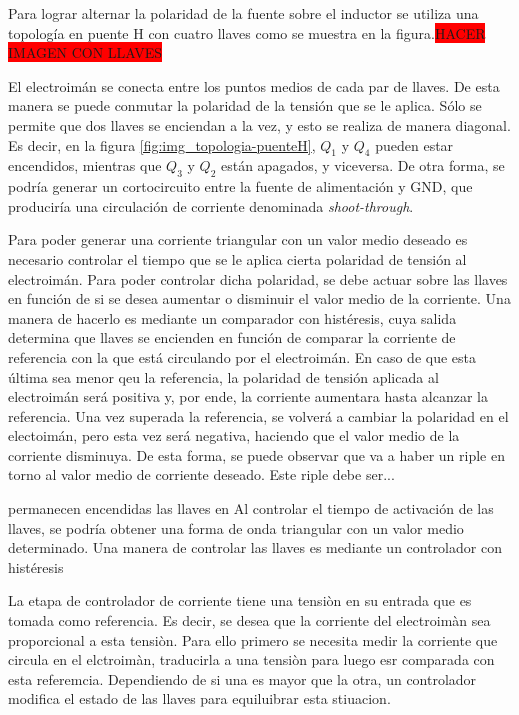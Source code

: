 \noindent Para lograr alternar la polaridad de la fuente sobre el inductor se utiliza una topología en puente H con cuatro llaves como se  muestra en la figura.\colorbox{red}{HACER IMAGEN CON LLAVES} 

El electroimán se conecta entre los puntos medios de cada par de llaves. De esta manera se puede conmutar la polaridad de la tensión que se le aplica. Sólo se permite que dos llaves se enciendan a la vez, y esto se realiza de manera diagonal. Es decir, en la figura \ref{fig:img_topologia-puenteH}, $Q_1$ y $Q_4$ pueden estar encendidos, mientras que $Q_3$ y $Q_2$ están apagados, y viceversa. De otra forma, se podría generar un cortocircuito entre la fuente de alimentación y GND, que produciría una circulación de corriente denominada \textsl{shoot-through}.

Para poder generar una corriente triangular con un valor medio deseado es necesario controlar el tiempo que se le aplica cierta polaridad de tensión al electroimán. Para poder controlar dicha polaridad, se debe actuar sobre las llaves en función de si se desea aumentar o disminuir el valor medio de la corriente.  Una manera de hacerlo es mediante un comparador con histéresis, cuya salida determina que llaves se encienden en función de comparar la corriente de referencia con la que está circulando por el electroimán. En caso de que esta última sea menor qeu la referencia, la polaridad de tensión aplicada al electroimán será positiva y, por ende, la corriente aumentara hasta alcanzar la referencia. Una vez superada la referencia, se volverá a cambiar la polaridad en el electoimán, pero esta vez será negativa, haciendo que el valor medio de la corriente disminuya. De esta forma, se puede observar que va a haber un riple en torno al valor medio de corriente deseado.  Este riple debe ser...



permanecen encendidas las llaves en 
Al controlar el tiempo de activación de las llaves, se podría obtener una forma de onda triangular con un valor medio determinado. Una manera de controlar las llaves es mediante un controlador con histéresis

La etapa de controlador de corriente tiene una tensiòn en su entrada que es tomada como referencia. Es decir, se desea que la corriente del electroimàn sea proporcional a esta tensiòn. Para ello primero se necesita medir la corriente que circula en el elctroimàn, traducirla a una tensiòn para luego esr comparada con esta referemcia. Dependiendo de si una es mayor que la otra, un controlador modifica el estado de las llaves para equiluibrar esta stiuacion. 

